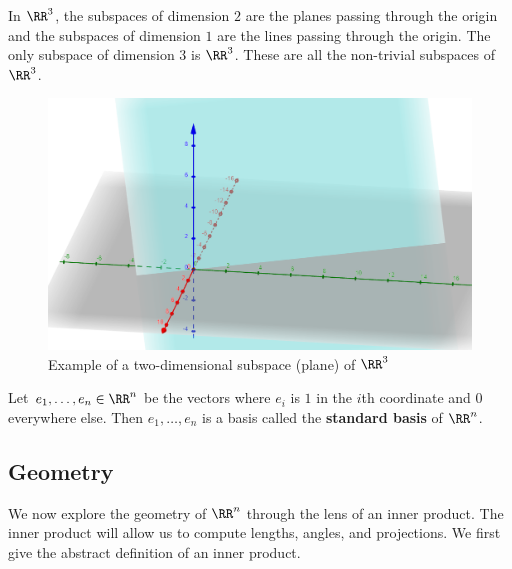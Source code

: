 \documentclass[11pt]{article}
\begin{document}
\begin{example}
    In $\RR^3$, the subspaces of dimension $2$ are the planes passing through the origin and the subspaces of dimension $1$ are the lines passing through the origin. The only subspace of dimension $3$ is $\RR^3$. These are all the non-trivial subspaces of $\RR^3$.
\end{example}
\begin{figure}[h]
\begin{center}
    \includegraphics[scale = 0.3]{../images/image2.png}
    \caption{Example of a two-dimensional subspace (plane) of $\RR^3$}
\end{center}
\end{figure}

\begin{defn}
    Let $e_1, \ldots, e_n \in \RR^n$ be the vectors where $e_i$ is $1$ in the $i$th coordinate and $0$ everywhere else. Then $e_1, \ldots, e_n$ is a basis called the \textbf{standard basis} of $\RR^n$. 
\end{defn}

\subsection{Geometry}

We now explore the geometry of $\RR^n$ through the lens of an inner product. The inner product will allow us to compute lengths, angles, and projections. We first give the abstract definition of an inner product. 
\end{document}
